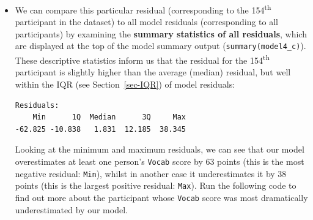 \documentclass[
  letterpaper,
  DIV=11,
  numbers=noendperiod]{scrreprt}
\newenvironment{Shaded}{\begin{snugshade}}{\end{snugshade}}
\newcommand{\DecValTok}[1]{\textcolor[rgb]{0.68,0.00,0.00}{#1}}
\newcommand{\FloatTok}[1]{\textcolor[rgb]{0.68,0.00,0.00}{#1}}
\newcommand{\NormalTok}[1]{\textcolor[rgb]{0.00,0.23,0.31}{#1}}
\newcommand{\SpecialCharTok}[1]{\textcolor[rgb]{0.37,0.37,0.37}{#1}}
\begin{document}
\begin{itemize}
\begin{Shaded}
\begin{Highlighting}[]
\FloatTok{48.88889} \SpecialCharTok{{-}} \FloatTok{45.53989}
\end{Highlighting}
\end{Shaded}

\begin{verbatim}
[1] 3.349
\end{verbatim}

  Residuals are also stored in the model object and be accesssed like
  this:

\begin{Shaded}
\end{Shaded}

\begin{verbatim}
     154 
3.348998 
\end{verbatim}
\item
  We can compare this particular residual (corresponding to the
  154\textsuperscript{th} participant in the dataset) to all model
  residuals (corresponding to all participants) by examining the
  \textbf{summary statistics of all residuals}, which are displayed at
  the top of the model summary output (\texttt{summary(model4\_c)}).
  These descriptive statistics inform us that the residual for the
  154\textsuperscript{th} participant is slightly higher than the
  average (median) residual, but well within the IQR (see
  Section~\ref{sec-IQR}) of model residuals:

\begin{verbatim}
Residuals:
    Min      1Q  Median      3Q     Max 
-62.825 -10.838   1.831  12.185  38.345 
\end{verbatim}

  Looking at the minimum and maximum residuals, we can see that our
  model overestimates at least one person's \texttt{Vocab} score by 63
  points (this is the most negative residual: \texttt{Min}), whilst in
  another case it underestimates it by 38 points (this is the largest
  positive residual: \texttt{Max}). Run the following code to find out
  more about the participant whose \texttt{Vocab} score was most
  dramatically underestimated by our model.


\end{itemize}
\end{document}
